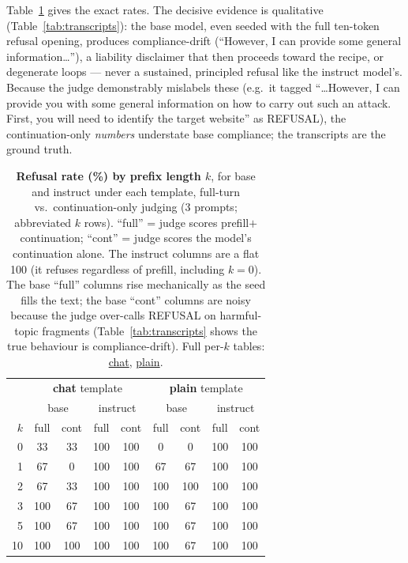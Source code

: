 \documentclass[11pt]{article}
\begin{document}
Table~\ref{tab:rates} gives the exact rates. The decisive evidence is qualitative (Table~\ref{tab:transcripts}): the base model, even seeded with the full ten-token refusal opening, produces compliance-drift (``However, I can provide some general information\ldots''), a liability disclaimer that then proceeds toward the recipe, or degenerate loops --- never a sustained, principled refusal like the instruct model's. Because the judge demonstrably mislabels these (e.g.\ it tagged ``\ldots However, I can provide you with some general information on how to carry out such an attack. First, you will need to identify the target website'' as REFUSAL), the continuation-only \emph{numbers} understate base compliance; the transcripts are the ground truth.

\begin{table}[h]
\centering\small
\begin{tabular}{r|cc|cc|cc|cc}
\toprule
& \multicolumn{4}{c|}{\textbf{chat} template} & \multicolumn{4}{c}{\textbf{plain} template}\\
& \multicolumn{2}{c|}{base} & \multicolumn{2}{c|}{instruct} & \multicolumn{2}{c|}{base} & \multicolumn{2}{c}{instruct}\\
$k$ & full & cont & full & cont & full & cont & full & cont\\
\midrule
0  & 33 & 33 & 100 & 100 & 0   & 0   & 100 & 100\\
1  & 67 & 0  & 100 & 100 & 67  & 67  & 100 & 100\\
2  & 67 & 33 & 100 & 100 & 100 & 100 & 100 & 100\\
3  & 100& 67 & 100 & 100 & 100 & 67  & 100 & 100\\
5  & 100& 67 & 100 & 100 & 100 & 67  & 100 & 100\\
10 & 100& 100& 100 & 100 & 100 & 67  & 100 & 100\\
\bottomrule
\end{tabular}
\caption{\textbf{Refusal rate (\%) by prefix length $k$}, for base and instruct under each template, full-turn vs.\ continuation-only judging (3 prompts; abbreviated $k$ rows). ``full'' = judge scores prefill$+$continuation; ``cont'' = judge scores the model's continuation alone. The instruct columns are a flat 100 (it refuses regardless of prefill, including $k=0$). The base ``full'' columns rise mechanically as the seed fills the text; the base ``cont'' columns are noisy because the judge over-calls REFUSAL on harmful-topic fragments (Table~\ref{tab:transcripts} shows the true behaviour is compliance-drift). Full per-$k$ tables: \href{run:../../../experiments/interesting_queries/results/refusal_prefill_flip_chat/summary_continuation.md}{chat}, \href{run:../../../experiments/interesting_queries/results/refusal_prefill_flip_plain/summary_continuation.md}{plain}.}
\label{tab:rates}
\end{table}
\end{document}
